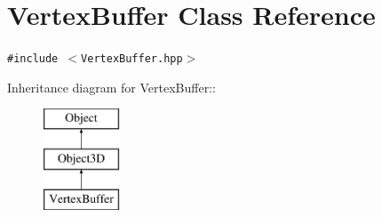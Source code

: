 \hypertarget{classm3g_1_1VertexBuffer}{
\section{VertexBuffer Class Reference}
\label{classm3g_1_1VertexBuffer}
}
{\tt \#include $<$VertexBuffer.hpp$>$}

Inheritance diagram for VertexBuffer::\begin{figure}[H]
\begin{center}
\leavevmode
\includegraphics[height=3cm]{classm3g_1_1VertexBuffer}
\end{center}
\end{figure}
